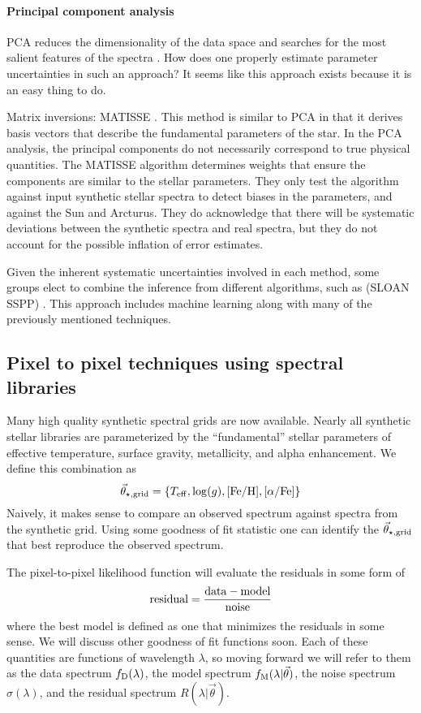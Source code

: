 \documentclass[preprint]{aastex} %
\newcommand{\vt}{\vec{\theta}}
\newcommand{\vg}{\vt_{\star, {\rm grid}}}
\newcommand{\fM}{f_{\rm M}}
\newcommand{\fD}{f_{\rm D}}
\newcommand{\Z}{[{\rm Fe}/{\rm H}]}
\newcommand{\A}{[\alpha/{\rm Fe}]}
\begin{document}
\paragraph{Principal component analysis} PCA reduces the dimensionality of the data space and searches for the most salient features of the spectra \citep{ptb14}. How does one properly estimate parameter uncertainties in such an approach? It seems like this approach exists because it is an easy thing to do.

Matrix inversions: MATISSE \citep{rbd06}. This method is similar to PCA in that it derives basis vectors that describe the fundamental parameters of the star. In the PCA analysis, the principal components do not necessarily correspond to true physical quantities. The MATISSE algorithm determines weights that ensure the components are similar to the stellar parameters. They only test the algorithm against input synthetic stellar spectra to detect biases in the parameters, and against the Sun and Arcturus. They do acknowledge that there will be systematic deviations between the synthetic spectra and real spectra, but they do not account for the possible inflation of error estimates.

Given the inherent systematic uncertainties involved in each method, some groups elect to combine the inference from different algorithms, such as (SLOAN SSPP) \citep{lbs+08}. This approach includes machine learning along with many of the previously mentioned techniques.

\subsection{Pixel to pixel techniques using spectral libraries}
Many high quality synthetic spectral grids are now available. Nearly all synthetic stellar libraries are parameterized by the ``fundamental'' stellar parameters of effective temperature, surface gravity, metallicity, and alpha enhancement. We define this combination as 
\begin{equation}
  \vg = \{T_{\rm eff}, \log(g), \Z, \A \}
\end{equation}
Naively, it makes sense to compare an observed spectrum against spectra from the synthetic grid. Using some goodness of fit statistic one can identify the $\vg$ that best reproduce the observed spectrum. 

The pixel-to-pixel likelihood function will evaluate the residuals in some form of 
\begin{equation}
  {\rm residual} = \frac{ {\rm data} - {\rm model}}{ {\rm noise}}
\end{equation}
where the best model is defined as one that minimizes the residuals in some sense. We will discuss other goodness of fit functions soon. Each of these quantities are functions of wavelength $\lambda$, so moving forward we will refer to them as the data spectrum $\fD(\lambda)$, the model spectrum $\fM(\lambda | \vt)$, the noise spectrum $\sigma(\lambda)$, and the residual spectrum $R(\lambda | \vt)$.
\end{document}
